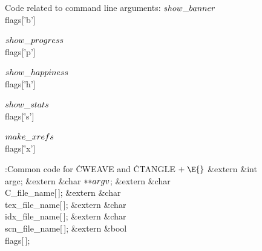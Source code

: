 Code related to command line arguments:
\Y\B\4\D$\\{show\_banner}$ \5
\\{flags}[\.{'b'}]\par
\B\4\D$\\{show\_progress}$ \5
\\{flags}[\.{'p'}]\par
\B\4\D$\\{show\_happiness}$ \5
\\{flags}[\.{'h'}]\par
\B\4\D$\\{show\_stats}$ \5
\\{flags}[\.{'s'}]\par
\B\4\D$\\{make\_xrefs}$ \5
\\{flags}[\.{'x'}]\par
\Y\B\4:Common code for \.{CWEAVE} and \.{CTANGLE}\X${}\mathrel+\E{}$\6
\&{extern} \&{int} \\{argc};\6
\&{extern} \&{char} ${}{*}{*}\\{argv}{}$;\6
\&{extern} \&{char} \\{C\_file\_name}[\,];\6
\&{extern} \&{char} \\{tex\_file\_name}[\,];\6
\&{extern} \&{char} \\{idx\_file\_name}[\,];\6
\&{extern} \&{char} \\{scn\_file\_name}[\,];\6
\&{extern} \&{bool} \\{flags}[\,];\par
\fi

